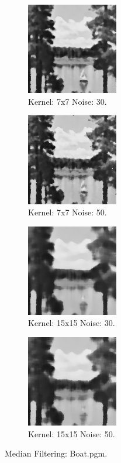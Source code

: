 \documentclass[letterpaper,10pt]{article}
\begin{document}
  \begin{figure}[hbtp]
    \centering
    \begin{subfigure}{4cm}
      \includegraphics[width=4cm]{images/median_boat_7.png}
      \caption{Kernel: 7x7 Noise: 30.}
    \end{subfigure}
    \begin{subfigure}{4cm}
      \includegraphics[width=4cm]{images/median_boat_7_50.png}
      \caption{Kernel: 7x7 Noise: 50.}
    \end{subfigure}
    \begin{subfigure}{4cm}
      \includegraphics[width=4cm]{images/median_boat_15.png}
      \caption{Kernel: 15x15 Noise: 30.}
    \end{subfigure}
    \begin{subfigure}{4cm}
      \includegraphics[width=4cm]{images/median_boat_15_50.png}
      \caption{Kernel: 15x15 Noise: 50.}
    \end{subfigure}
    \caption{Median Filtering: Boat.pgm.}
    \label{fig:medianboat}
  \end{figure}
\end{document}
